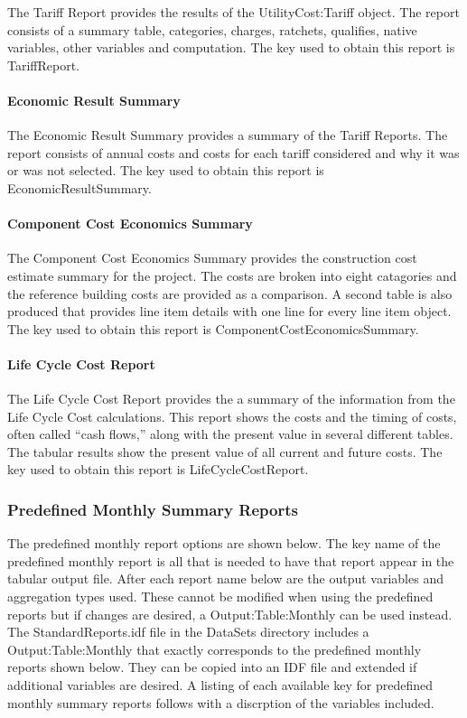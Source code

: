 The Tariff Report provides the results of the UtilityCost:Tariff object. The report consists of a summary table, categories, charges, ratchets, qualifies, native variables, other variables and computation. The key used to obtain this report is TariffReport.

\paragraph{Economic Result Summary}\label{EconomicResultSummary}

The Economic Result Summary provides a summary of the Tariff Reports. The report consists of annual costs and costs for each tariff considered and why it was or was not selected. The key used to obtain this report is EconomicResultSummary.

\paragraph{Component Cost Economics Summary}\label{component-cost-economics-summary}

The Component Cost Economics Summary provides the construction cost estimate summary for the project. The costs are broken into eight catagories and the reference building costs are provided as a comparison. A second table is also produced that provides line item details with one line for every line item object. The key used to obtain this report is ComponentCostEconomicsSummary.

\paragraph{Life Cycle Cost Report}\label{LifeCycleCostReport}

The Life Cycle Cost Report provides the a summary of the information from the Life Cycle Cost calculations.  This report shows the costs and the timing of costs, often called “cash flows,” along with the present value in several different tables. The tabular results show the present value of all current and future costs. The key used to obtain this report is LifeCycleCostReport.


\subsubsection{Predefined Monthly Summary Reports}\label{predefined-monthly-summary-reports}

The predefined monthly report options are shown below. The key name of the predefined monthly report is all that is needed to have that report appear in the tabular output file. After each report name below are the output variables and aggregation types used. These cannot be modified when using the predefined reports but if changes are desired, a Output:Table:Monthly can be used instead. The StandardReports.idf file in the DataSets directory includes a Output:Table:Monthly that exactly corresponds to the predefined monthly reports shown below. They can be copied into an IDF file and extended if additional variables are desired. A listing of each available key for predefined monthly summary reports follows with a discrption of the variables included.

